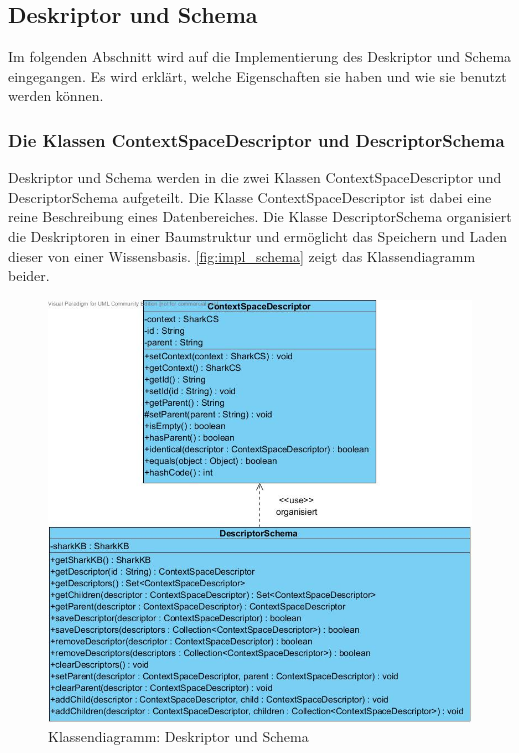 \documentclass[a4paper]{article}
\begin{document}
	\subsection{Deskriptor und Schema}
	
	Im folgenden Abschnitt wird auf die Implementierung des Deskriptor und Schema
	eingegangen. Es wird erklärt, welche Eigenschaften sie haben und wie sie benutzt
	werden können.
	
	\subsubsection{Die Klassen ContextSpaceDescriptor und DescriptorSchema}
	
	Deskriptor und Schema werden in die zwei Klassen ContextSpaceDescriptor
	und DescriptorSchema aufgeteilt. Die Klasse ContextSpaceDescriptor ist dabei
	eine reine Beschreibung eines Datenbereiches. Die Klasse DescriptorSchema
	organisiert die Deskriptoren in einer Baumstruktur und ermöglicht das
	Speichern und Laden dieser von einer Wissensbasis. \autoref{fig:impl_schema}
	zeigt das Klassendiagramm beider.
	
	\begin{figure}[H]
		\includegraphics[width=\linewidth]{../Bilder/impl_schema.jpg}
		\caption{Klassendiagramm: Deskriptor und Schema}
		\label{fig:impl_schema}
	\end{figure}	
	
\end{document}
